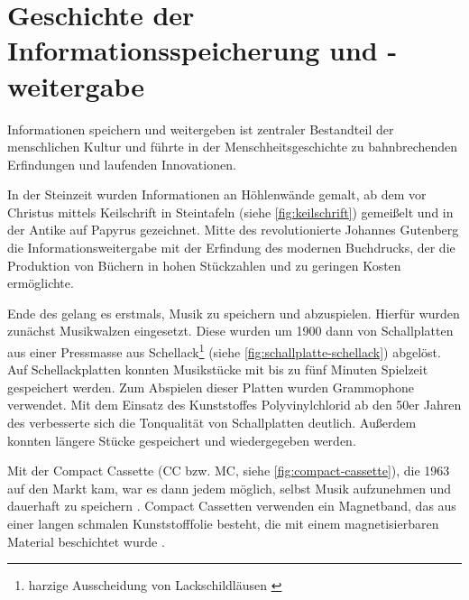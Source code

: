\section{Geschichte der Informationsspeicherung und -weitergabe}
\label{sec:einleitung}

Informationen speichern und weitergeben ist zentraler Bestandteil der
menschlichen Kultur und führte in der Menschheitsgeschichte zu bahnbrechenden
Erfindungen und laufenden Innovationen.

In der Steinzeit wurden Informationen an Höhlenwände gemalt, ab dem
 vor Christus mittels Keilschrift in Steintafeln
(siehe \autoref{fig:keilschrift}) gemeißelt und in der Antike auf Papyrus
gezeichnet. Mitte des  revolutionierte Johannes
Gutenberg die Informationsweitergabe mit der Erfindung des modernen Buchdrucks,
der die Produktion von Büchern in hohen Stückzahlen und zu geringen Kosten
ermöglichte.

Ende des  gelang es erstmals, Musik zu speichern und
abzuspielen. Hierfür wurden zunächst Musikwalzen eingesetzt. Diese wurden um
1900 dann von Schallplatten aus einer Pressmasse aus Schellack\footnote{harzige
Ausscheidung von Lackschildläusen \cite{schellack}} (siehe
\autoref{fig:schallplatte-schellack}) abgelöst. Auf Schellackplatten konnten
Musikstücke mit bis zu fünf Minuten Spielzeit gespeichert werden. Zum Abspielen
dieser Platten wurden Grammophone verwendet. Mit dem Einsatz des Kunststoffes
Polyvinylchlorid ab den 50er Jahren des  verbesserte
sich die Tonqualität von Schallplatten deutlich. Außerdem konnten längere Stücke
gespeichert und wiedergegeben werden. \cite{schallplatte1}

Mit der Compact Cassette (CC bzw. MC, siehe \autoref{fig:compact-cassette}), die
1963 auf den Markt kam, war es dann jedem möglich, selbst Musik aufzunehmen und
dauerhaft zu speichern \cite{kassette}. Compact Cassetten verwenden ein
Magnetband, das aus einer langen schmalen Kunststofffolie besteht, die mit einem
magnetisierbaren Material beschichtet wurde \cite{tonband}.

